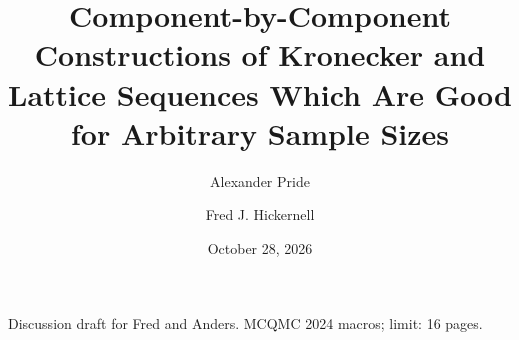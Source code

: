 \documentclass{svproc}
\title{Component-by-Component Constructions of Kronecker and Lattice Sequences Which Are Good for Arbitrary Sample Sizes}
\author{Alexander Pride \and Fred J. Hickernell}
\institute{}
\date{October 28, 2026}
\begin{document}
\mainmatter
\maketitle
\begin{center}\small Discussion draft for Fred and Anders. MCQMC 2024 macros; limit: 16 pages.\end{center}










\end{document}
